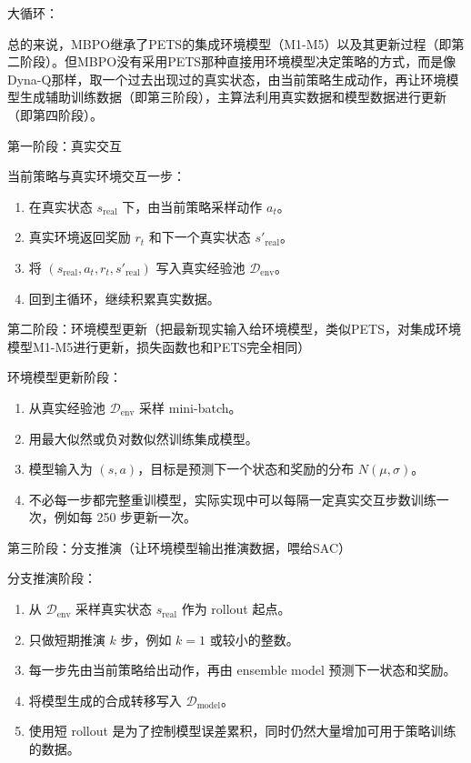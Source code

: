 大循环：

总的来说，MBPO继承了PETS的集成环境模型（M1-M5）以及其更新过程（即第二阶段）。但MBPO没有采用PETS那种直接用环境模型决定策略的方式，而是像Dyna-Q那样，取一个过去出现过的真实状态，由当前策略生成动作，再让环境模型生成辅助训练数据（即第三阶段），主算法利用真实数据和模型数据进行更新（即第四阶段）。

第一阶段：真实交互

当前策略与真实环境交互一步：

\begin{enumerate}
\def\labelenumi{\arabic{enumi}.}
\tightlist
\item
  在真实状态 \(s_{\mathrm{real}}\) 下，由当前策略采样动作 \(a_t\)。
\item
  真实环境返回奖励 \(r_t\) 和下一个真实状态 \(s'_{\mathrm{real}}\)。
\item
  将 \((s_{\mathrm{real}},a_t,r_t,s'_{\mathrm{real}})\) 写入真实经验池 \(\mathcal D_{\mathrm{env}}\)。
\item
  回到主循环，继续积累真实数据。
\end{enumerate}

第二阶段：环境模型更新（把最新现实输入给环境模型，类似PETS，对集成环境模型M1-M5进行更新，损失函数也和PETS完全相同）

环境模型更新阶段：

\begin{enumerate}
\def\labelenumi{\arabic{enumi}.}
\tightlist
\item
  从真实经验池 \(\mathcal D_{\mathrm{env}}\) 采样 mini-batch。
\item
  用最大似然或负对数似然训练集成模型。
\item
  模型输入为 \((s,a)\)，目标是预测下一个状态和奖励的分布 \(N(\mu,\sigma)\)。
\item
  不必每一步都完整重训模型，实际实现中可以每隔一定真实交互步数训练一次，例如每 250 步更新一次。
\end{enumerate}

第三阶段：分支推演（让环境模型输出推演数据，喂给SAC）

分支推演阶段：

\begin{enumerate}
\def\labelenumi{\arabic{enumi}.}
\tightlist
\item
  从 \(\mathcal D_{\mathrm{env}}\) 采样真实状态 \(s_{\mathrm{real}}\) 作为 rollout 起点。
\item
  只做短期推演 \(k\) 步，例如 \(k=1\) 或较小的整数。
\item
  每一步先由当前策略给出动作，再由 ensemble model 预测下一状态和奖励。
\item
  将模型生成的合成转移写入 \(\mathcal D_{\mathrm{model}}\)。
\item
  使用短 rollout 是为了控制模型误差累积，同时仍然大量增加可用于策略训练的数据。
\end{enumerate}


